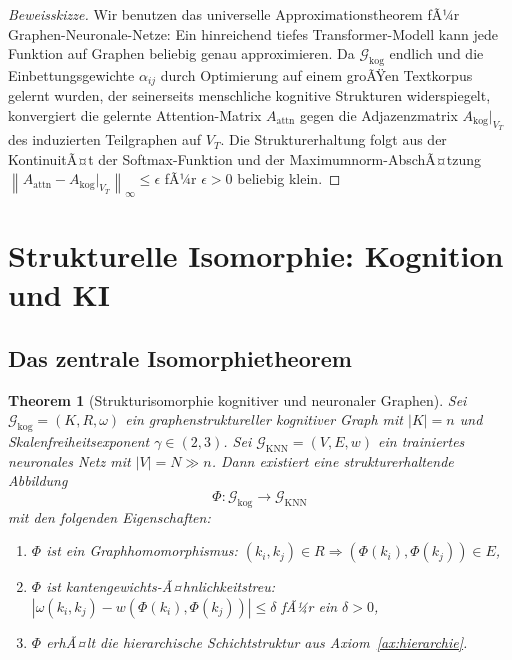 ﻿\documentclass[12pt,a4paper]{article}
\theoremstyle{plain}
\newtheorem{theorem}{Theorem}[section]
\theoremstyle{definition}
\theoremstyle{remark}
\newcommand{\GG}{\mathcal{G}}
\newcommand{\KNN}{\text{KNN}}
\newcommand{\norm}[1]{\left\|#1\right\|}
\begin{document}
\begin{proof}[Beweisskizze]
Wir benutzen das universelle Approximationstheorem fÃ¼r Graphen-Neuro\-nale-Netze: Ein hinreichend tiefes Transformer-Modell kann jede Funktion auf Graphen beliebig genau approximieren. Da $\GG_{\text{kog}}$ endlich und die Einbettungsgewichte $\alpha_{ij}$ durch Optimierung auf einem groÃŸen Textkorpus gelernt wurden, der seinerseits menschliche kognitive Strukturen widerspiegelt, konvergiert die gelernte Attention-Matrix $A_{\text{attn}}$ gegen die Adjazenzmatrix $A_{\text{kog}}|_{V_T}$ des induzierten Teilgraphen auf $V_T$. Die Strukturerhaltung folgt aus der KontinuitÃ¤t der Softmax-Funktion und der Maximumnorm-AbschÃ¤tzung $\norm{A_{\text{attn}} - A_{\text{kog}}|_{V_T}}_\infty \leq \epsilon$ fÃ¼r $\epsilon > 0$ beliebig klein.
\end{proof}

\section{Strukturelle Isomorphie: Kognition und KI}
\label{sec:isomorphie}

\subsection{Das zentrale Isomorphietheorem}

\begin{theorem}[Strukturisomorphie kognitiver und neuronaler Graphen]
\label{thm:hauptsatz}
Sei $\GG_{\text{kog}} = (K, R, \omega)$ ein graphenstruktureller kognitiver Graph mit $|K| = n$ und Skalenfreiheitsexponent $\gamma \in (2,3)$. Sei $\GG_{\KNN} = (V, E, w)$ ein trainiertes neuronales Netz mit $|V| = N \gg n$. Dann existiert eine strukturerhaltende Abbildung
\[
  \Phi: \GG_{\text{kog}} \to \GG_{\KNN}
\]
mit den folgenden Eigenschaften:
\begin{enumerate}[label=(\roman*)]
  \item $\Phi$ ist ein Graphhomomorphismus: $(k_i, k_j) \in R \Rightarrow (\Phi(k_i), \Phi(k_j)) \in E$,
  \item $\Phi$ ist \emph{kantengewichts-Ã¤hnlichkeitstreu}: $\left|\omega(k_i,k_j) - w(\Phi(k_i), \Phi(k_j))\right| \leq \delta$ fÃ¼r ein $\delta > 0$,
  \item $\Phi$ erhÃ¤lt die hierarchische Schichtstruktur aus Axiom~\ref{ax:hierarchie}.
\end{enumerate}
\end{theorem}
\end{document}
